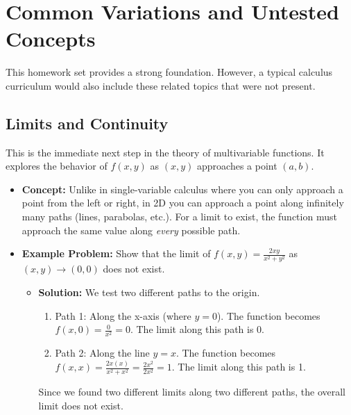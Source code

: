 \documentclass{article}
\begin{document}
\section{Common Variations and Untested Concepts}
This homework set provides a strong foundation. However, a typical calculus curriculum would also include these related topics that were not present.

\subsection{Limits and Continuity}
This is the immediate next step in the theory of multivariable functions. It explores the behavior of $f(x, y)$ as $(x, y)$ approaches a point $(a, b)$.
\begin{itemize}
    \item \textbf{Concept:} Unlike in single-variable calculus where you can only approach a point from the left or right, in 2D you can approach a point along infinitely many paths (lines, parabolas, etc.). For a limit to exist, the function must approach the same value along \textit{every} possible path.
    \item \textbf{Example Problem:} Show that the limit of $f(x, y) = \frac{2xy}{x^2+y^2}$ as $(x,y) \to (0,0)$ does not exist.
    \begin{itemize}
        \item \textbf{Solution:} We test two different paths to the origin.
        \begin{enumerate}
            \item Path 1: Along the x-axis (where $y=0$). The function becomes $f(x, 0) = \frac{0}{x^2} = 0$. The limit along this path is 0.
            \item Path 2: Along the line $y=x$. The function becomes $f(x, x) = \frac{2x(x)}{x^2+x^2} = \frac{2x^2}{2x^2} = 1$. The limit along this path is 1.
        \end{enumerate}
        Since we found two different limits along two different paths, the overall limit does not exist.
    \end{itemize}
\end{itemize}
\end{document}
